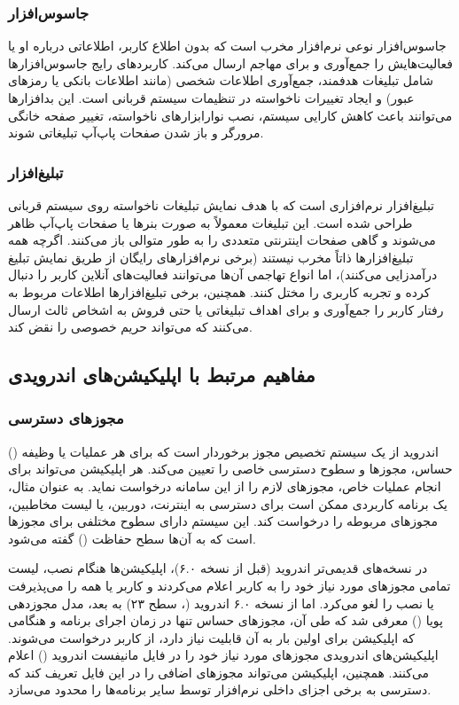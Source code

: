 \subsubsection{جاسوس‌افزار}
جاسوس‌افزار نوعی نرم‌افزار مخرب است که بدون اطلاع کاربر، اطلاعاتی درباره او یا فعالیت‌هایش را جمع‌آوری و برای مهاجم ارسال می‌کند. کاربردهای رایج جاسوس‌افزارها شامل تبلیغات هدفمند، جمع‌آوری اطلاعات شخصی (مانند اطلاعات بانکی یا رمزهای عبور) و ایجاد تغییرات ناخواسته در تنظیمات سیستم قربانی است. این بدافزارها می‌توانند باعث کاهش کارایی سیستم، نصب نوارابزارهای ناخواسته، تغییر صفحه خانگی مرورگر و باز شدن صفحات پاپ‌آپ تبلیغاتی شوند.

\subsubsection{تبلیغ‌افزار}
تبلیغ‌افزار نرم‌افزاری است که با هدف نمایش تبلیغات ناخواسته روی سیستم قربانی طراحی شده است. این تبلیغات معمولاً به صورت بنرها یا صفحات پاپ‌آپ ظاهر می‌شوند و گاهی صفحات اینترنتی متعددی را به طور متوالی باز می‌کنند. اگرچه همه تبلیغ‌افزارها ذاتاً مخرب نیستند (برخی نرم‌افزارهای رایگان از طریق نمایش تبلیغ درآمدزایی می‌کنند)، اما انواع تهاجمی آن‌ها می‌توانند فعالیت‌های آنلاین کاربر را دنبال کرده و تجربه کاربری را مختل کنند. همچنین، برخی تبلیغ‌افزارها اطلاعات مربوط به رفتار کاربر را جمع‌آوری و برای اهداف تبلیغاتی یا حتی فروش به اشخاص ثالث ارسال می‌کنند که می‌تواند حریم خصوصی را نقض کند.

\subsection{مفاهیم مرتبط با اپلیکیشن‌های اندرویدی}

\subsubsection{مجوزهای دسترسی}
اندروید از یک سیستم تخصیص مجوز برخوردار است که برای هر عملیات یا وظیفه () حساس، مجوزها و سطوح دسترسی خاصی را تعیین می‌کند. هر اپلیکیشن می‌تواند برای انجام عملیات خاص، مجوزهای لازم را از این سامانه درخواست نماید. به عنوان مثال، یک برنامه کاربردی ممکن است برای دسترسی به اینترنت، دوربین، یا لیست مخاطبین، مجوزهای مربوطه را درخواست کند. این سیستم دارای سطوح مختلفی برای مجوزها است که به آن‌ها سطح حفاظت () گفته می‌شود.

در نسخه‌های قدیمی‌تر اندروید (قبل از نسخه ۶.۰)، اپلیکیشن‌ها هنگام نصب، لیست تمامی مجوزهای مورد نیاز خود را به کاربر اعلام می‌کردند و کاربر یا همه را می‌پذیرفت یا نصب را لغو می‌کرد. اما از نسخه ۶.۰ اندروید (،  سطح ۲۳) به بعد، مدل مجوزدهی پویا () معرفی شد که طی آن، مجوزهای حساس تنها در زمان اجرای برنامه و هنگامی که اپلیکیشن برای اولین بار به آن قابلیت نیاز دارد، از کاربر درخواست می‌شوند. اپلیکیشن‌های اندرویدی مجوزهای مورد نیاز خود را در فایل مانیفست اندروید () اعلام می‌کنند. همچنین، اپلیکیشن می‌تواند مجوزهای اضافی را در این فایل تعریف کند که دسترسی به برخی اجزای داخلی نرم‌افزار توسط سایر برنامه‌ها را محدود می‌سازد.

